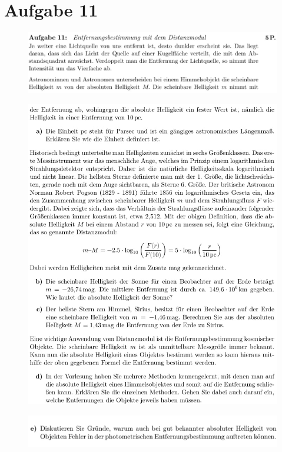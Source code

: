 \section{Aufgabe 11}

    \begin{figure}[H]
        \centering
        \includegraphics[width=\linewidth]{images/Aufgabe11_1.jpg}
        \label{fig:2}
    \end{figure}

    \begin{figure}[H]
        \centering
        \includegraphics[width=\linewidth]{images/Aufgabe11_2.jpg}
        \label{fig:3}
    \end{figure}

    \begin{figure}[H]
        \centering
        \includegraphics[width=\linewidth]{images/Aufgabe11_3.jpg}
        \label{fig:4}
    \end{figure}

